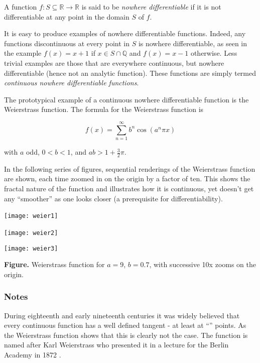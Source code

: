 \documentclass[12pt]{article}
\begin{document}
A function $f:S\subseteq \mathbb{R}\to \mathbb{R}$ is said to be \emph{nowhere differentiable} if it is not differentiable at any point in the domain $S$ of $f$.

It is easy to produce examples of nowhere differentiable functions.  Indeed, any functions discontinuous at every point in $S$ is nowhere differentiable, as seen in the example $f(x)=x+1$ if $x\in S\cap \mathbb{Q}$ and $f(x)=x-1$ otherwise.  Less trivial examples are those that are everywhere continuous, but nowhere differentiable (hence not an analytic function).  These functions are simply termed \emph{continuous nowhere differentiable functions}.

The prototypical example of a continuous nowhere differentiable function is the Weierstrass function.  The formula for the Weierstrass function is

$$ f(x) = \sum_{n=1}^\infty b^n \cos(a^n \pi x) $$

with $a$ odd, $0 < b < 1$, and $ab > 1 + \frac{3}{2}\pi$.  

In the following series of figures, sequential renderings of the Weierstrass function are shown, each time zoomed in on the origin by a factor of ten. This shows the fractal nature of the function and illustrates how it is continuous, yet doesn't get any ``smoother'' as one looks closer (a prerequisite for differentiability).

\begin{center}
\texttt{[image: weier1]}\ \smallskip

\texttt{[image: weier2]}\ \smallskip

\texttt{[image: weier3]}\smallskip

\textbf{Figure.} Weierstrass function for $a=9$, $b=0.7$, with successive 10x zooms on the origin.
\end{center}

\subsubsection*{Notes}
During eighteenth and early nineteenth centuries it was 
widely believed that every continuous function has a well defined
tangent - at least at ``'' points. 
As the Weierstrass function shows that this is clearly not the case. 
The function is named after Karl Weierstrass who presented it 
in a lecture for the Berlin Academy in 1872 \cite{stewart}. 
\end{document}
